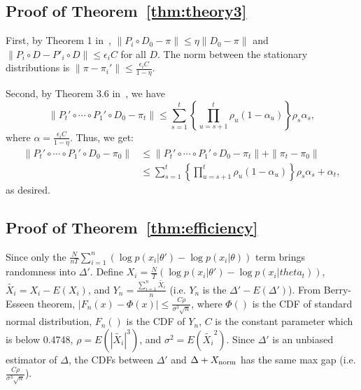 \documentclass{article}
\begin{document}
\subsection{Proof of Theorem~\ref{thm:theory3}}\label{app:theory3}

First, by Theorem 1 in~\cite{cutting_mh_2014}, $\|P_i \circ D_0 - \pi\| \leq \eta \|D_0
- \pi\|$ and $\|P_i\circ D-P'_i\circ D\| \leq \epsilon_i C$ for all $D$. The norm between the
stationary distributions is $\|\pi - \pi_i'\|\leq \frac{\epsilon_i C}{1-\eta}$.

Second, by Theorem 3.6 in~\cite{yang2013sequential}, we have 
\[
\| P_t' \circ \cdots \circ P_1' \circ D_0 - \pi_t \| \leq \sum_{s=1}^t \left\{\prod _{u=s+1}^t
\rho_u (1-\alpha_u)\right\} \rho_s \alpha_s,
\]
where $\alpha = \frac{\epsilon_i C}{1-\eta}$.  Thus, we get:
\begin{align*}
 \| P_t' \circ \cdots \circ P_1' \circ D_0 - \pi_0 \| &\leq \|P_t' \circ \cdots \circ P_1' \circ D_0 - \pi_t\| + \|\pi_t - \pi_0\| \\
 &\leq \sum_{s=1}^t \left\{\prod _{u=s+1}^t \rho_u (1-\alpha_u)\right\} \rho_s \alpha_s + \alpha_t,
\end{align*}
as desired.

\subsection{Proof of Theorem~\ref{thm:efficiency}}\label{app:theory4}
Since only the $\frac{N}{nT}\sum_{i=1}^n \left(\log p(x_i|\theta') - \log p(x_i|\theta) \right)$ term brings randomness into $\Delta'$. Define $X_i = \frac{N}{T}\left(\log p(x_i|\theta') - \log p (x_i|theta_t) \right)$, $\tilde{X_i} = X_i - E(X_i)$, and $Y_n = \frac{\sum_{i=1}^n \tilde{X_i}}{n}$ (i.e. $Y_n$ is the $\Delta' - E(\Delta')$). From Berry-Esseen theorem, $|F_n(x) - \Phi(x)| \leq \frac{C\rho}{\sigma^3\sqrt{n}}$, where $\Phi()$ is the CDF of standard normal distribution, $F_n()$ is the CDF of $Y_n$, $C$ is the constant parameter which is below 0.4748, $\rho = E(|\tilde{X_i}|^3)$, and $\sigma^2 = E(\tilde{X_i}^2)$. Since $\Delta'$ is an unbiased estimator of $\Delta$, the CDFs between $\Delta'$ and $\Delta + X_{\rm norm}$ has the same max gap (i.e. $\frac{C\rho}{\sigma^3\sqrt{n}}$).
\end{document}
